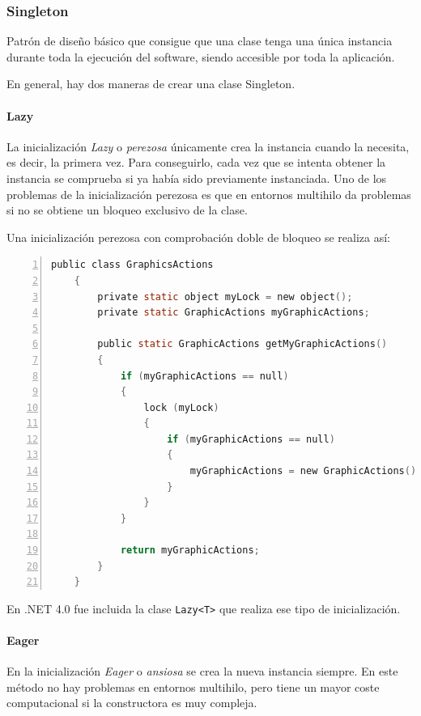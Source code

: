 \subsubsection{Singleton}
Patr\'on de dise\~no b\'asico que consigue que una clase tenga una \'unica instancia durante toda la ejecuci\'on del software, siendo 
accesible por toda la aplicaci\'on.

En general, hay dos maneras de crear una clase Singleton.

\paragraph{Lazy} La inicializaci\'on \emph{Lazy} o \emph{perezosa} \'unicamente crea la instancia cuando la necesita, es decir, la primera vez.
Para conseguirlo, cada vez que se intenta obtener la instancia se comprueba si ya hab\'ia sido previamente instanciada. Uno de los problemas de
la inicializaci\'on perezosa es que en entornos multihilo da problemas si no se obtiene un bloqueo exclusivo de la clase.

Una inicializaci\'on perezosa con comprobaci\'on doble de bloqueo se realiza as\'i:
\begin{lstlisting}[language=C, numbers=left, showspaces=false, breaklines=true, tabsize=2]
    public class GraphicsActions 
    {
        private static object myLock = new object();
        private static GraphicActions myGraphicActions;
        
        public static GraphicActions getMyGraphicActions()
        {
            if (myGraphicActions == null)
            {
                lock (myLock)
                {
                    if (myGraphicActions == null)
                    {
                        myGraphicActions = new GraphicActions();
                    }
                }
            }
            
            return myGraphicActions;
        }
    }
\end{lstlisting}

En .NET 4.0 fue incluida la clase \texttt{Lazy<T>} que realiza ese tipo de inicializaci\'on.

\paragraph{Eager} En la inicializaci\'on \emph{Eager} o \emph{ansiosa} se crea la nueva instancia siempre. En este m\'etodo no hay problemas
en entornos multihilo, pero tiene un mayor coste computacional si la constructora es muy compleja.

